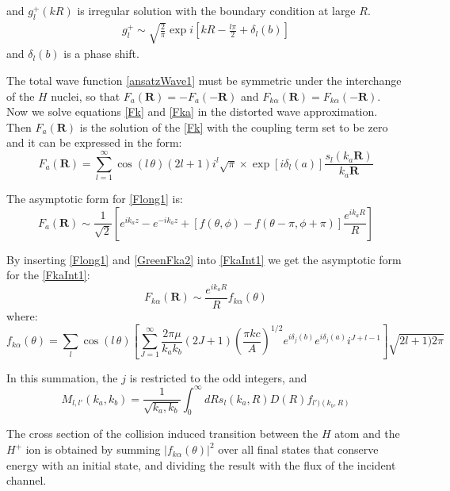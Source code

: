 and $ g^{+}_l(kR) $ is irregular solution with the boundary condition at large $ R $.
\begin{equation}
\begin{split}
g^{+}_{l} \sim \sqrt{\frac{2}{\pi}}\exp i\left[kR - \frac{l\pi}{2} + \delta_l(b)\right]
\end{split}
\end{equation}
and $  \delta_l(b) $ is a phase shift. 

The total wave function \eqref{ansatzWave1} must be symmetric under the interchange of the $ H $ nuclei, so that $ F_a(\mathbf{R}) = -F_a(-\mathbf{R}) $ and $ F_{k\alpha}(\mathbf{R}) =  F_{k\alpha}(-\mathbf{R}) $. Now we solve equations \eqref{Fk} and \eqref{Fka} in the distorted wave approximation. Then $ F_a(\mathbf{R}) $ is the solution of the \eqref{Fk} with the coupling term set to be zero and it can be expressed in the form:
\begin{equation}\label{Flong1}
F_a(\mathbf{R}) = \sum_{l=1}^{\infty}{\cos(l\,\theta)(2l+1)i^{l}\sqrt{\pi}\times \exp[i\delta_l(a)]\frac{s_l(k_a\mathbf{R})}{k_a\mathbf{R} } } 
\end{equation}

The asymptotic form for \eqref{Flong1} is:
\begin{equation}\label{FlongA}
F_a(\mathbf{R}) \sim \frac{1}{\sqrt{2}}\left[e^{ik_az}-e^{-ik_az} + [f(\theta,\phi) - f(\theta-\pi,\phi+\pi)]\frac{e^{ik_aR}}{R}\right]
\end{equation}

By inserting \eqref{Flong1} and \eqref{GreenFka2} into \eqref{FkaInt1} we get the asymptotic form for the  \eqref{FkaInt1}:
\begin{equation}\label{FlongAA1}
F_{k\alpha}(\mathbf{R}) \sim \frac{e^{ik_aR}}{R}f_{k\alpha}(\theta)
\end{equation}
where:
\begin{equation}\label{fkaa1}
f_{k\alpha}(\theta) = \sum_{l}{\cos(l\,\theta)\left[\sum_{J=1}^{\infty}{\frac{2\pi\mu}{k_ak_b}(2J+1)\left(\frac{\pi k c}{A}\right)^{1/2}e^{i\delta_j(b)}e^{i\delta_j(a)}i^{J+l-1} }\right]\sqrt{2l+1)2\pi}}
\end{equation}

In this summation, the $ j $ is restricted to the odd integers, and 
\begin{equation}\label{Mll1}
M_{l,l'}(k_a,k_b) = \frac{1}{\sqrt{k_a,k_b}}\int_0^{\infty}{dRs_l(k_a,R)D(R)f_{l')(k_b,R)} }
\end{equation}

The cross section of the collision induced transition between the $ H $ atom and the $ H^{+} $ ion is obtained by summing $ \left|f_{k\alpha}(\theta)\right|^2 $ over all final states that conserve energy with an initial state, and dividing the result with the flux of the incident channel.

